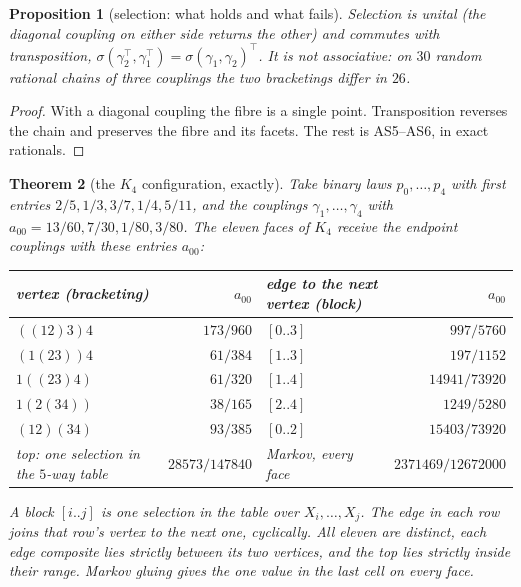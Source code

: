 \documentclass[11pt]{article}
\newtheorem{theorem}{Theorem}\newtheorem{proposition}[theorem]{Proposition}\newtheorem{lemma}[theorem]{Lemma}\newtheorem{corollary}[theorem]{Corollary}\newtheorem{conjecture}[theorem]{Conjecture}\crefname{conjecture}{Conjecture}{Conjectures}
\theoremstyle{definition}\newtheorem{definition}[theorem]{Definition}\newtheorem{remark}[theorem]{Remark}\newtheorem{example}[theorem]{Example}\newtheorem{problem}[theorem]{Open problem}\crefname{problem}{Problem}{Problems}
\begin{document}
\begin{proposition}[selection: what holds and what fails]\label{prop:selprops}
Selection is unital (the diagonal coupling on either side returns the other) and commutes with transposition, $\sigma(\gamma_2^{\!\top},\gamma_1^{\!\top})=\sigma(\gamma_1,\gamma_2)^{\!\top}$. It is not associative:
on $30$ random rational chains of three couplings the two bracketings differ in $26$.
\end{proposition}

\begin{proof}
With a diagonal coupling the fibre is a single point. Transposition reverses the chain and preserves the fibre and its facets. The rest is AS5--AS6, in exact rationals.
\end{proof}

\begin{theorem}[the $K_4$ configuration, exactly]\label{thm:k4}
Take binary laws $p_0,\dots,p_4$ with first entries $2/5,1/3,3/7,1/4,5/11$, and the couplings $\gamma_1,\dots,\gamma_4$ with $a_{00}=13/60,7/30,1/80,3/80$. The eleven faces of $K_4$ receive the endpoint
couplings with these entries $a_{00}$:
\begin{center}\footnotesize
\begin{tabular}{lrlr}\toprule
vertex (bracketing) & $a_{00}$ & edge to the next vertex (block) & $a_{00}$\\\midrule
$((12)3)4$ & $173/960$ & $[0..3]$ & $997/5760$\\
$(1(23))4$ & $61/384$ & $[1..3]$ & $197/1152$\\
$1((23)4)$ & $61/320$ & $[1..4]$ & $14941/73920$\\
$1(2(34))$ & $38/165$ & $[2..4]$ & $1249/5280$\\
$(12)(34)$ & $93/385$ & $[0..2]$ & $15403/73920$\\\midrule
top: one selection in the $5$-way table & $28573/147840$ & Markov, every face & $2371469/12672000$\\\bottomrule
\end{tabular}
\end{center}
A block $[i..j]$ is one selection in the table over $X_i,\dots,X_j$.
The edge in each row joins that row's vertex to the next one, cyclically. All eleven are distinct, each edge composite lies strictly between its two vertices, and the top lies strictly inside
their range. Markov gluing gives the one value in the last cell on every face.
\end{theorem}
\end{document}
